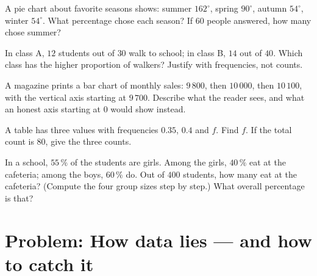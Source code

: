 \begin{exercise}[$\star$]\label{exo:g7:stats:7}
A pie chart about favorite seasons shows: summer $162^\circ$, spring
$90^\circ$, autumn $54^\circ$, winter $54^\circ$. What percentage
chose each season? If $60$ people answered, how many chose summer?
\end{exercise}

\begin{exercise}[$\star\star$]\label{exo:g7:stats:8}
In class A, $12$ students out of $30$ walk to school; in class B,
$14$ out of $40$. Which class has the higher proportion of walkers?
Justify with frequencies, not counts.
\end{exercise}

\begin{exercise}[$\star\star$]\label{exo:g7:stats:9}
A magazine prints a bar chart of monthly sales: $9\,800$, then
$10\,000$, then $10\,100$, with the vertical axis starting at
$9\,700$. Describe what the reader sees, and what an honest axis
starting at $0$ would show instead.
\end{exercise}

\begin{exercise}[$\star\star$]\label{exo:g7:stats:10}
A  table has three values with frequencies $0.35$, $0.4$ and
$f$. Find $f$. If the total count is $80$, give the three counts.
\end{exercise}

\begin{exercise}[$\star\star\star$]\label{exo:g7:stats:11}
In a school, $55\,\%$ of the students are girls. Among the girls,
$40\,\%$ eat at the cafeteria; among the boys, $60\,\%$ do. Out of
$400$ students, how many eat at the cafeteria? (Compute the four
group sizes step by step.) What overall percentage is that?
\end{exercise}

\section{Problem: How data lies --- and how to catch it}

